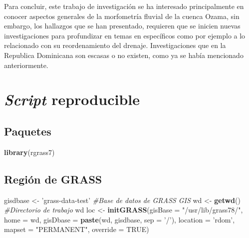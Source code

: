 \documentclass[11pt,]{article}
\newenvironment{Shaded}{\begin{snugshade}}{\end{snugshade}}
\newcommand{\KeywordTok}[1]{\textcolor[rgb]{0.13,0.29,0.53}{\textbf{#1}}}
\newcommand{\DataTypeTok}[1]{\textcolor[rgb]{0.13,0.29,0.53}{#1}}
\newcommand{\StringTok}[1]{\textcolor[rgb]{0.31,0.60,0.02}{#1}}
\newcommand{\CommentTok}[1]{\textcolor[rgb]{0.56,0.35,0.01}{\textit{#1}}}
\newcommand{\OtherTok}[1]{\textcolor[rgb]{0.56,0.35,0.01}{#1}}
\newcommand{\NormalTok}[1]{#1}
\begin{document}
Para concluir, este trabajo de investigación se ha interesado
principalmente en conocer aspectos generales de la morfometría fluvial
de la cuenca Ozama, sin embargo, los hallazgos que se han presentado,
requieren que se inicien nuevas investigaciones para profundizar en
temas en específicos como por ejemplo a lo relacionado con su
reordenamiento del drenaje. Investigaciones que en la Republica
Dominicana son escasas o no existen, como ya se había mencionado
anteriormente.

\section{\texorpdfstring{\emph{Script}
reproducible}{Script reproducible}}\label{script-reproducible}

\subsection{Paquetes}\label{paquetes}

\begin{Shaded}
\begin{Highlighting}[]
\KeywordTok{library}\NormalTok{(rgrass7)}
\end{Highlighting}
\end{Shaded}

\subsection{Región de GRASS}\label{regiuxf3n-de-grass}

\begin{Shaded}
\begin{Highlighting}[]
\NormalTok{gisdbase <-}\StringTok{ 'grass-data-test'} \CommentTok{#Base de datos de GRASS GIS}
\NormalTok{wd <-}\StringTok{ }\KeywordTok{getwd}\NormalTok{() }\CommentTok{#Directorio de trabajo}
\NormalTok{wd}
\NormalTok{loc <-}\StringTok{ }\KeywordTok{initGRASS}\NormalTok{(}\DataTypeTok{gisBase =} \StringTok{"/usr/lib/grass78/"}\NormalTok{,}
                 \DataTypeTok{home =}\NormalTok{ wd,}
                 \DataTypeTok{gisDbase =} \KeywordTok{paste}\NormalTok{(wd, gisdbase, }\DataTypeTok{sep =} \StringTok{'/'}\NormalTok{),}
                 \DataTypeTok{location =} \StringTok{'rdom'}\NormalTok{,}
                 \DataTypeTok{mapset =} \StringTok{"PERMANENT"}\NormalTok{,}
                 \DataTypeTok{override =} \OtherTok{TRUE}\NormalTok{)}
\end{Highlighting}
\end{Shaded}
\end{document}
